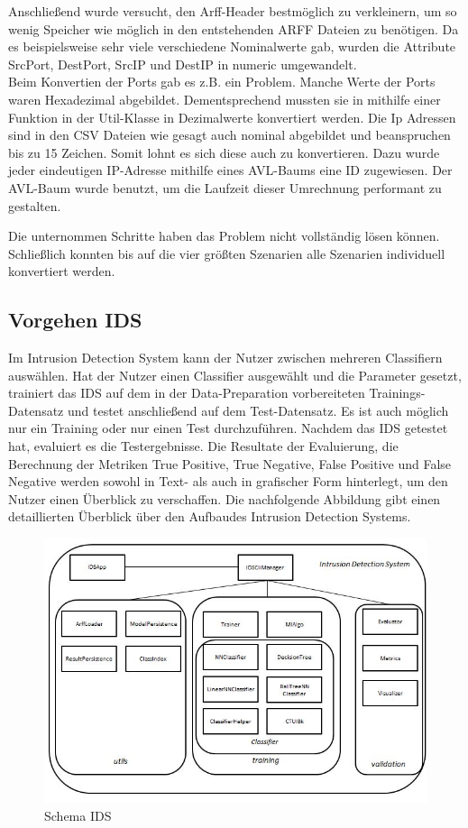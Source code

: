 \documentclass[main.tex]{subfiles}
\begin{document}
Anschließend wurde versucht, den Arff-Header bestmöglich zu verkleinern, um so
wenig Speicher wie möglich in den entstehenden ARFF Dateien zu benötigen.
Da es beispielsweise sehr viele verschiedene Nominalwerte gab, wurden die Attribute SrcPort, DestPort, SrcIP und DestIP in numeric umgewandelt. \\
Beim Konvertien der Ports gab es z.B. ein Problem.
Manche Werte der Ports waren Hexadezimal abgebildet. Dementsprechend mussten sie in mithilfe einer Funktion in der Util-Klasse in Dezimalwerte konvertiert werden.
Die Ip Adressen sind in den CSV Dateien wie gesagt auch nominal abgebildet und
beanspruchen bis zu 15 Zeichen.
Somit lohnt es sich diese auch zu konvertieren.
Dazu wurde jeder eindeutigen IP-Adresse mithilfe eines AVL-Baums eine ID zugewiesen.
Der AVL-Baum wurde benutzt, um die Laufzeit dieser Umrechnung performant zu
gestalten.

Die unternommen Schritte haben das Problem nicht vollständig lösen können.
Schließlich konnten bis auf die vier größten Szenarien alle Szenarien individuell konvertiert werden.

\subsection {Vorgehen IDS}

Im Intrusion Detection System kann der Nutzer zwischen mehreren Classifiern auswählen. Hat der Nutzer einen Classifier ausgewählt und die Parameter gesetzt, trainiert das IDS auf dem in der Data-Preparation vorbereiteten Trainings-Datensatz und testet anschließend auf dem Test-Datensatz. Es ist auch möglich nur ein Training oder nur einen Test durchzuführen. Nachdem das IDS getestet hat, evaluiert es die Testergebnisse. Die Resultate der Evaluierung, die Berechnung der Metriken True Positive, True Negative, False Positive und False Negative werden sowohl in Text- als auch in grafischer Form hinterlegt, um den Nutzer einen Überblick zu verschaffen.
Die nachfolgende Abbildung gibt einen detaillierten Überblick über den Aufbaudes Intrusion Detection Systems. \\

\begin{figure}[ht]
 \centering
 \includegraphics[width=1\textwidth]{images/Schema_IDS.jpg}
 \caption{Schema IDS}
 \label{schema_ids}
\end{figure}
\end{document}
